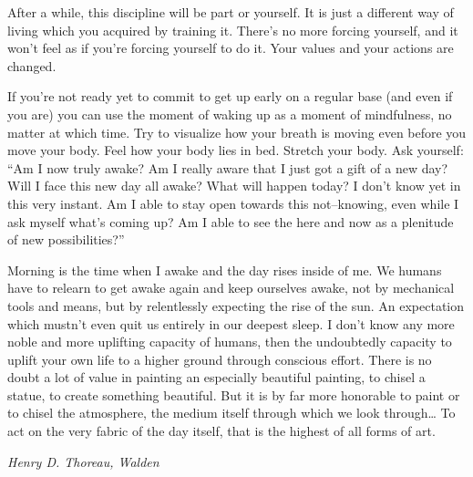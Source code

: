 \documentclass[../main.tex]{subfiles}
\begin{document}
After a while, this discipline will be part or yourself.
It is just a different way of living which you acquired by training it.
There's no more forcing yourself, and it won't feel as if you're forcing yourself to do it.
Your values and your actions are changed.

If you're not ready yet to commit to get up early on a regular base (and even if you are) you can use the moment of waking up as a moment of mindfulness, no matter at which time.
Try to visualize how your breath is moving even before you move your body.
Feel how your body lies in bed.
Stretch your body.
Ask yourself: ``Am I now truly awake? Am I really aware that I just got a gift of a new day?
Will I face this new day all awake? What will happen today?
I don't know yet in this very instant.
Am I able to stay open towards this not--knowing, even while I ask myself what's coming up?
Am I able to see the here and now as a plenitude of new possibilities?''

\setlength{}

\epigraph{Morning is the time when I awake and the day rises inside of me.
  We humans have to relearn to get awake again and keep ourselves awake, not by mechanical tools and means,
  but by relentlessly expecting the rise of the sun. An expectation which mustn't even quit us entirely in our deepest sleep.
  I don't know any more noble and more uplifting capacity of humans, then the undoubtedly capacity to uplift your own life to a higher ground through conscious effort.
  There is no doubt a lot of value in painting an especially beautiful painting, to chisel a statue, to create something beautiful.
  But it is by far more honorable to paint or to chisel the atmosphere, the medium itself through which we look through\ldots
  To act on the very fabric of the day itself, that is the highest of all forms of art.
}{\textit{Henry D. Thoreau, Walden}}
\setlength{}
\end{document}
